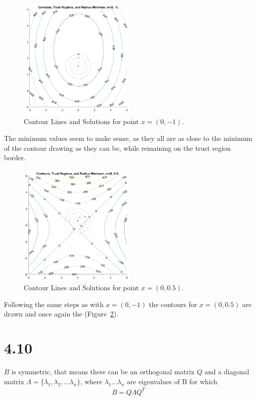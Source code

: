 \documentclass[11pt]{article} %
\begin{document}
\begin{figure}[H]
    \centering
    \includegraphics[width=0.5\textwidth]{4_1_1}
    \caption{Contour Lines and Solutions for point $x=(0,-1)$.}
    \label{fig:4_1_1}
\end{figure}
The minimum values seem to make sense, as they all are as close to the minimum of the contour drawing as they can be, while remaining on the trust region border.

\begin{figure}[H]
    \centering
    \includegraphics[width=0.5\textwidth]{4_1_2}
    \caption{Contour Lines and Solutions for point $x=(0,0.5)$.}
    \label{fig:4_1_2}
\end{figure}
Following the same steps as with $x=(0,-1)$ the contours for $x=(0,0.5)$ are drawn and once again the (Figure~\ref{fig:4_1_2}).

\section*{4.10}
$B$ is symmetric, that means there can be an orthogonal matrix $Q$ and a diagonal matrix $\Lambda = \{\lambda_1, \lambda_2, \dots \lambda_n\}$, where $\lambda_1 \dots \lambda_n$ are eigenvalues of B for which
\begin{gather*}
B = Q \Lambda Q^T
\end{gather*}
\end{document}
